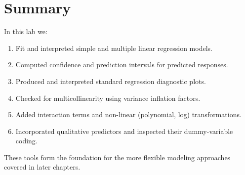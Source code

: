 \documentclass[
  11pt,
]{article}
\providecommand{\tightlist}{%
  \setlength{\itemsep}{0pt}\setlength{\parskip}{0pt}}
\begin{document}
\section{Summary}\label{summary}

In this lab we:

\begin{enumerate}
\def\labelenumi{\arabic{enumi}.}
\tightlist
\item
  Fit and interpreted simple and multiple linear regression models.
\item
  Computed confidence and prediction intervals for predicted responses.
\item
  Produced and interpreted standard regression diagnostic plots.
\item
  Checked for multicollinearity using variance inflation factors.
\item
  Added interaction terms and non-linear (polynomial, log)
  transformations.
\item
  Incorporated qualitative predictors and inspected their dummy-variable
  coding.
\end{enumerate}

These tools form the foundation for the more flexible modeling
approaches covered in later chapters.
\end{document}
